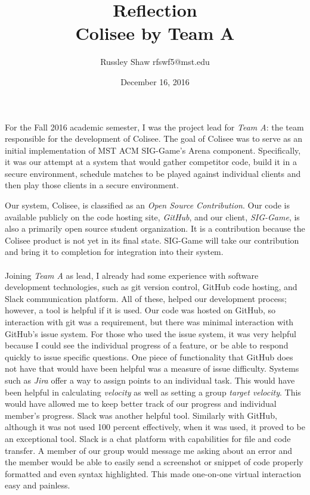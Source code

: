 \documentclass{article}
\title{Reflection \\ Colisee by Team A}
\author{Russley Shaw rfswf5@mst.edu}
\date{December 16, 2016}
\begin{document}
\maketitle
\newpage

For the Fall 2016 academic semester, I was the project lead for \textit{Team A}: the team responsible for the development of Colisee. The goal of Colisee was to serve as an initial implementation of MST ACM SIG-Game's Arena component. Specifically, it was our attempt at a system that would gather competitor code, build it in a secure environment, schedule matches to be played against individual clients and then play those clients in a secure environment. 

Our system, Colisee, is classified as an \textit{Open Source Contribution}. Our code is available publicly on the code hosting site, \textit{GitHub}, and our client, \textit{SIG-Game}, is also a primarily open source student organization. It is a contribution because the Colisee product is not yet in its final state. SIG-Game will take our contribution and bring it to completion for integration into their system. 

\paragraph{}
Joining \textit{Team A} as lead, I already had some experience with software development technologies, such as git version control, GitHub code hosting, and Slack communication platform. All of these, helped our development process; however, a tool is helpful if it is used. Our code was hosted on GitHub, so interaction with git was a requirement, but there was minimal interaction with GitHub's issue system. For those who used the issue system, it was very helpful because I could see the individual progress of a feature, or be able to respond quickly to issue specific questions. One piece of functionality that GitHub does not have that would have been helpful was a measure of issue difficulty. Systems such as \textit{Jira} offer a way to assign points to an individual task. This would have been helpful in calculating \textit{velocity} as well as setting a group \textit{target velocity}. This would have allowed me to keep better track of our progress and individual member's progress. Slack was another helpful tool. Similarly with GitHub, although it was not used 100 percent effectively, when it was used, it proved to be an exceptional tool. Slack is a chat platform with capabilities for file and code transfer. A member of our group would message me asking about an error and the member would be able to easily send a screenshot or snippet of code properly formatted and even syntax highlighted. This made one-on-one virtual interaction easy and painless.
\end{document}
